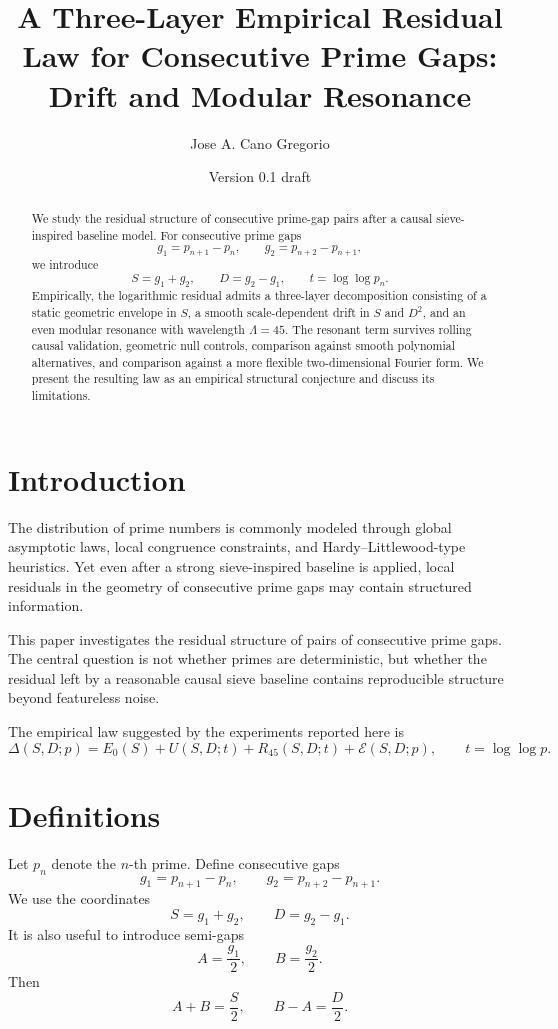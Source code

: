 \documentclass[11pt]{article}
\title{A Three-Layer Empirical Residual Law for Consecutive Prime Gaps:\\ Drift and Modular Resonance}
\author{Jose A. Cano Gregorio}
\date{Version 0.1 draft}
\begin{document}
\maketitle

\begin{abstract}
We study the residual structure of consecutive prime-gap pairs after a causal sieve-inspired baseline model. For consecutive prime gaps
\[
g_1=p_{n+1}-p_n,\qquad g_2=p_{n+2}-p_{n+1},
\]
we introduce
\[
S=g_1+g_2,\qquad D=g_2-g_1,\qquad t=\log\log p_n.
\]
Empirically, the logarithmic residual admits a three-layer decomposition consisting of a static geometric envelope in \(S\), a smooth scale-dependent drift in \(S\) and \(D^2\), and an even modular resonance with wavelength \(\Lambda=45\). The resonant term survives rolling causal validation, geometric null controls, comparison against smooth polynomial alternatives, and comparison against a more flexible two-dimensional Fourier form. We present the resulting law as an empirical structural conjecture and discuss its limitations.
\end{abstract}

\section{Introduction}

The distribution of prime numbers is commonly modeled through global asymptotic laws, local congruence constraints, and Hardy--Littlewood-type heuristics. Yet even after a strong sieve-inspired baseline is applied, local residuals in the geometry of consecutive prime gaps may contain structured information.

This paper investigates the residual structure of pairs of consecutive prime gaps. The central question is not whether primes are deterministic, but whether the residual left by a reasonable causal sieve baseline contains reproducible structure beyond featureless noise.

The empirical law suggested by the experiments reported here is
\[
\Delta(S,D;p)=E_0(S)+U(S,D;t)+R_{45}(S,D;t)+\mathcal{E}(S,D;p),
\qquad t=\log\log p.
\]

\section{Definitions}

Let \(p_n\) denote the \(n\)-th prime. Define consecutive gaps
\[
g_1=p_{n+1}-p_n,\qquad
g_2=p_{n+2}-p_{n+1}.
\]
We use the coordinates
\[
S=g_1+g_2,\qquad D=g_2-g_1.
\]
It is also useful to introduce semi-gaps
\[
A=\frac{g_1}{2},\qquad B=\frac{g_2}{2}.
\]
Then
\[
A+B=\frac{S}{2},\qquad B-A=\frac{D}{2}.
\]
\end{document}
